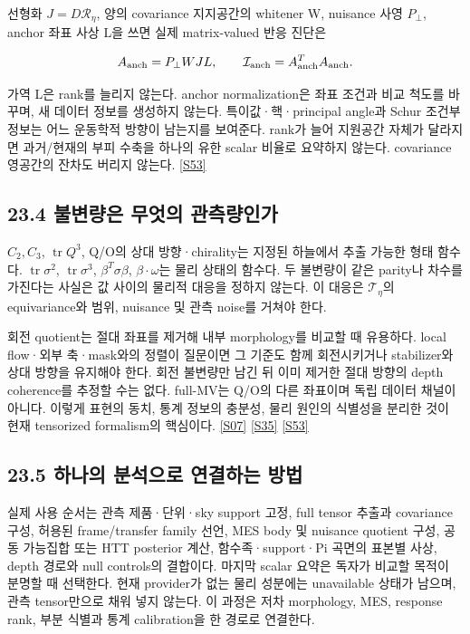 \documentclass[11pt,a4paper]{article}
\begin{document}
선형화 \(J=D\mathcal R_\eta\), 양의 covariance 지지공간의 whitener W, nuisance 사영 \(P_\perp\), anchor 좌표 사상 L을 쓰면 실제 matrix-valued 반응 진단은


\[
A_{\rm anch}=P_\perp WJL,\qquad
\mathcal I_{\rm anch}=A_{\rm anch}^TA_{\rm anch}.
\]

가역 L은 rank를 늘리지 않는다. anchor normalization은 좌표 조건과 비교 척도를 바꾸며, 새 데이터 정보를 생성하지 않는다. 특이값·핵·principal angle과 Schur 조건부 정보는 어느 운동학적 방향이 남는지를 보여준다. rank가 늘어 지원공간 자체가 달라지면 과거/현재의 부피 수축을 하나의 유한 scalar 비율로 요약하지 않는다. covariance 영공간의 잔차도 버리지 않는다. \hyperlink{src:S53}{[S53]}


\subsection*{23.4 불변량은 무엇의 관측량인가}

\(C_2,C_3\), \(\operatorname{tr}Q^3\), Q/O의 상대 방향·chirality는 지정된 하늘에서 추출 가능한 형태 함수다. \(\operatorname{tr}\sigma^2\), \(\operatorname{tr}\sigma^3\), \(\beta^T\sigma\beta\), \(\beta\cdot\omega\)는 물리 상태의 함수다. 두 불변량이 같은 parity나 차수를 가진다는 사실은 값 사이의 물리적 대응을 정하지 않는다. 이 대응은 \(\mathcal T_\eta\)의 equivariance와 범위, nuisance 및 관측 noise를 거쳐야 한다.


회전 quotient는 절대 좌표를 제거해 내부 morphology를 비교할 때 유용하다. local flow·외부 축·mask와의 정렬이 질문이면 그 기준도 함께 회전시키거나 stabilizer와 상대 방향을 유지해야 한다. 회전 불변량만 남긴 뒤 이미 제거한 절대 방향의 depth coherence를 추정할 수는 없다. full-MV는 Q/O의 다른 좌표이며 독립 데이터 채널이 아니다. 이렇게 표현의 동치, 통계 정보의 충분성, 물리 원인의 식별성을 분리한 것이 현재 tensorized formalism의 핵심이다. \hyperlink{src:S07}{[S07]} \hyperlink{src:S35}{[S35]} \hyperlink{src:S53}{[S53]}


\subsection*{23.5 하나의 분석으로 연결하는 방법}

실제 사용 순서는 관측 제품·단위·sky support 고정, full tensor 추출과 covariance 구성, 허용된 frame/transfer family 선언, MES body 및 nuisance quotient 구성, 공동 가능집합 또는 HTT posterior 계산, 함수족·support·Pi 곡면의 표본별 사상, depth 경로와 null controls의 결합이다. 마지막 scalar 요약은 독자가 비교할 목적이 분명할 때 선택한다. 현재 provider가 없는 물리 성분에는 unavailable 상태가 남으며, 관측 tensor만으로 채워 넣지 않는다. 이 과정은 저차 morphology, MES, response rank, 부분 식별과 통계 calibration을 한 경로로 연결한다.
\end{document}
